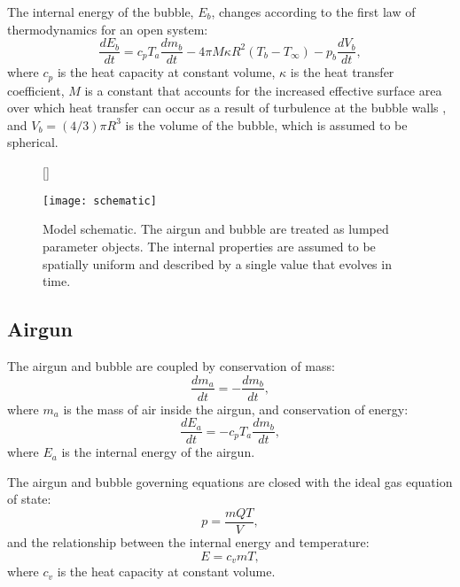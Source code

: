 \documentclass[10pt]{article}
\begin{document}
The internal energy of the bubble, $E_b$, changes according to the first law of thermodynamics for an open system:
\begin{equation}
\frac{dE_b}{dt} = c_p T_a \frac{dm_b}{dt} - 4 \pi M \kappa R^2 (T_b - T_\infty) - p_b \frac{dV_b}{dt},
\end{equation}
where $c_p$ is the heat capacity at constant volume, $\kappa$ is the heat transfer coefficient, $M$ is a constant that accounts for the increased effective surface area over which heat transfer can occur as a result of turbulence at the bubble walls \citep{Laws1990}, and $V_b = (4/3) \pi R^3$ is the volume of the bubble, which is assumed to be spherical.

\begin{figure}[t!]
\centering
{}[\FBwidth]
{\caption{Model schematic. The airgun and bubble are treated as lumped parameter objects. The internal properties are assumed to be spatially uniform and described by a single value that evolves in time. }
\label{fig:schematic}}
{\texttt{[image: schematic]}}
\end{figure}

\subsection{Airgun}
The airgun and bubble are coupled by conservation of mass:
\begin{equation}
\frac{dm_a}{dt} = -\frac{dm_b}{dt},
\end{equation}
where $m_a$ is the mass of air inside the airgun, and conservation of energy:
\begin{equation}
\frac{dE_a}{dt} = -c_p T_a \frac{dm_b}{dt},
\end{equation}
where $E_a$ is the internal energy of the airgun. 

The airgun and bubble governing equations are closed with the ideal gas equation of state:
\begin{equation}
p = \frac{mQT}{V},
\end{equation}
and the relationship between the internal energy and temperature:
\begin{equation}
E = c_v m T,
\end{equation}
where $c_v$ is the heat capacity at constant volume. 
\end{document}
